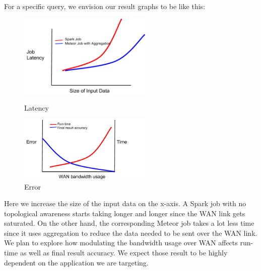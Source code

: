 For a specific query, we envision our result graphs to be like this:

\begin{figure}[ht]
	\centering
	\begin{minipage}[b]{0.48\linewidth}
		\includegraphics[width=2.5in]{figs/fig_1.png}
		\caption{Latency}
		\label{fig:minipage1}
	\end{minipage}
	\quad
	\begin{minipage}[b]{0.48\linewidth}
		\includegraphics[width=2.5in]{figs/fig_2.png}
		\caption{Error}
		\label{fig:minipage2}
	\end{minipage}
\end{figure}

Here we increase the size of the input data on the x-axis. A Spark job with no topological awareness starts taking longer and longer since the WAN link gets saturated. On the other hand, the corresponding Meteor job takes a lot less time since it uses aggregation to reduce the data needed to be sent over the WAN link. We plan to explore how modulating the bandwidth usage over WAN affects run-time as well as final result accuracy. We expect those result to be highly dependent on the application we are targeting.